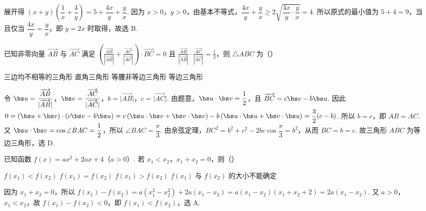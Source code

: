 \begin{solution}
展开得 \((x+y)\left(\dfrac{1}{x}+\dfrac{4}{y}\right)=5+\dfrac{4x}{y}+\dfrac{y}{x}\). 因为 \(x>0\)，\(y>0\)，由基本不等式，\(\dfrac{4x}{y}+\dfrac{y}{x}\geqslant2\sqrt{\dfrac{4x}{y}\cdot\dfrac{y}{x}}=4\). 所以原式的最小值为 \(5+4=9\)，当且仅当 \(\dfrac{4x}{y}=\dfrac{y}{x}\)，即 \(y=2x\) 时取得，故选 B.
\end{solution}

\begin{problem}
已知非零向量 \(\overrightarrow{AB}\) 与 \(\overrightarrow{AC}\) 满足 \(\left(\frac{\overrightarrow{AB}}{|\overrightarrow{AB}|} + \frac{\overrightarrow{AC}}{|\overrightarrow{AC}|}\right)\cdot \overrightarrow{BC} = 0\) 且 \(\frac{\overrightarrow{AB}}{|\overrightarrow{AB}|}\cdot \frac{\overrightarrow{AC}}{|\overrightarrow{AC}|} = \frac{1}{2}\)，则 \(\triangle ABC\) 为（\quad）

\choices
    {三边均不相等的三角形}
    {直角三角形}
    {等腰非等边三角形}
    {等边三角形}
\end{problem}


\begin{solution}
令 \(\bs u=\dfrac{\overrightarrow{AB}}{\lvert\overrightarrow{AB}\rvert}\)，\(\bs v=\dfrac{\overrightarrow{AC}}{\lvert\overrightarrow{AC}\rvert}\)，\(b=\lvert\overrightarrow{AB}\rvert\)，\(c=\lvert\overrightarrow{AC}\rvert\). 由题意，\(\bs u\cdot\bs v=\dfrac{1}{2}\)，且 \(\overrightarrow{BC}=c\bs v-b\bs u\). 因此 \(0=(\bs u+\bs v)\cdot(c\bs v-b\bs u)=c\left(\bs u\cdot\bs v+\bs v\cdot\bs v\right)-b\left(\bs u\cdot\bs u+\bs v\cdot\bs u\right)=\dfrac{3}{2}(c-b)\). 所以 \(b=c\)，即 \(AB=AC\). 又 \(\bs u\cdot\bs v=\cos\angle BAC=\dfrac12\)，所以 \(\angle BAC=\dfrac\pi3\). 由余弦定理，\(BC^{2}=b^{2}+c^{2}-2bc\cos\dfrac\pi3=b^{2}\)，从而 \(BC=b=c\). 故三角形 \(ABC\) 为等边三角形，选 D.
\end{solution}

\begin{problem}
已知函数 \( f(x) = ax^2 + 2ax + 4 \)（\(a > 0\)）. 若 \(x_1 < x_2\)，\(x_1 + x_2 = 0\)，则（\quad）

\choices
    {\(f(x_{1}) < f(x_{2})\)}
    {\(f(x_{1}) = f(x_{2})\)}
    {\(f(x_{1}) > f(x_{2})\)}
    {\(f(x_{1})\) 与 \(f(x_{2})\) 的大小不能确定}
\end{problem}


\begin{solution}
因为 \(x_{1}+x_{2}=0\)，所以 \(f(x_{1})-f(x_{2})=a(x_{1}^{2}-x_{2}^{2})+2a(x_{1}-x_{2})=a(x_{1}-x_{2})(x_{1}+x_{2}+2)=2a(x_{1}-x_{2})\). 又 \(a>0\)，\(x_{1}<x_{2}\)，故 \(f(x_{1})-f(x_{2})<0\)，即 \(f(x_{1})<f(x_{2})\)，选 A.
\end{solution}


